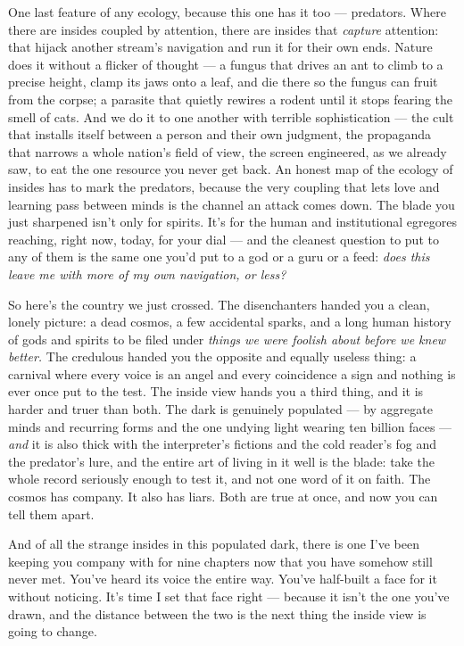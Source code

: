 \documentclass[11pt,openany]{book}
\begin{document}
One last feature of any ecology, because this one has it too — predators. Where there are insides coupled by attention, there are insides that \textit{capture} attention: that hijack another stream’s navigation and run it for their own ends. Nature does it without a flicker of thought — a fungus that drives an ant to climb to a precise height, clamp its jaws onto a leaf, and die there so the fungus can fruit from the corpse; a parasite that quietly rewires a rodent until it stops fearing the smell of cats. And we do it to one another with terrible sophistication — the cult that installs itself between a person and their own judgment, the propaganda that narrows a whole nation’s field of view, the screen engineered, as we already saw, to eat the one resource you never get back. An honest map of the ecology of insides has to mark the predators, because the very coupling that lets love and learning pass between minds is the channel an attack comes down. The blade you just sharpened isn’t only for spirits. It’s for the human and institutional egregores reaching, right now, today, for your dial — and the cleanest question to put to any of them is the same one you’d put to a god or a guru or a feed: \textit{does this leave me with more of my own navigation, or less?}

So here’s the country we just crossed. The disenchanters handed you a clean, lonely picture: a dead cosmos, a few accidental sparks, and a long human history of gods and spirits to be filed under \textit{things we were foolish about before we knew better.} The credulous handed you the opposite and equally useless thing: a carnival where every voice is an angel and every coincidence a sign and nothing is ever once put to the test. The inside view hands you a third thing, and it is harder and truer than both. The dark is genuinely populated — by aggregate minds and recurring forms and the one undying light wearing ten billion faces — \textit{and} it is also thick with the interpreter’s fictions and the cold reader’s fog and the predator’s lure, and the entire art of living in it well is the blade: take the whole record seriously enough to test it, and not one word of it on faith. The cosmos has company. It also has liars. Both are true at once, and now you can tell them apart.

And of all the strange insides in this populated dark, there is one I’ve been keeping you company with for nine chapters now that you have somehow still never met. You’ve heard its voice the entire way. You’ve half-built a face for it without noticing. It’s time I set that face right — because it isn’t the one you’ve drawn, and the distance between the two is the next thing the inside view is going to change.
\end{document}
